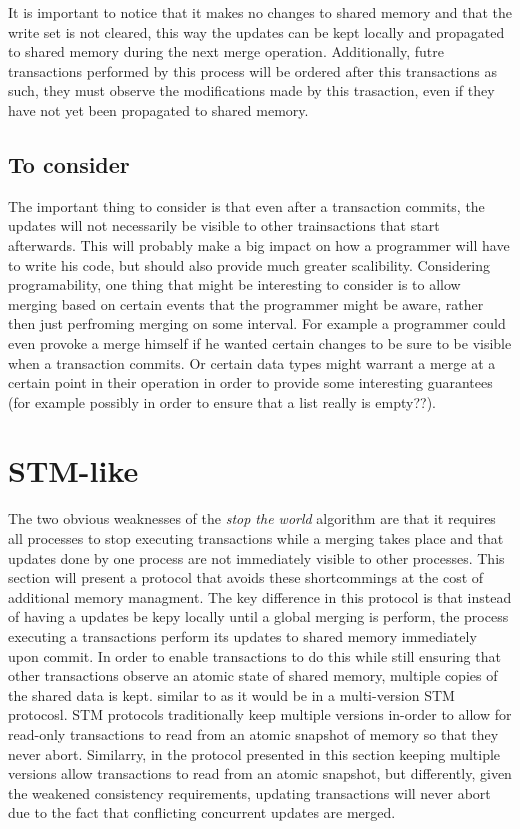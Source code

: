\documentclass[11pt,letterpaper]{article}
\begin{document}
It is important to notice that it makes no changes to shared memory and that the write set is not cleared,
this way the updates can be kept locally and propagated to shared memory during the next merge operation.
Additionally, futre transactions performed by this process will be ordered after this
transactions as such, they must observe the modifications made by this trasaction, even if they
have not yet been propagated to shared memory.


\subsection{To consider}
The important thing to consider is that even after a transaction commits, the updates will not
necessarily be visible to other trainsactions that start afterwards.
This will probably make a big impact on how a programmer will have to write his code, but should
also provide much greater scalibility.
Considering programability, one thing that might be interesting to consider is to allow merging
based on certain events that the programmer might be aware, rather then just perfroming merging
on some interval.
For example a programmer could even provoke a merge himself if he wanted certain changes to be sure
to be visible when a transaction commits.
Or certain data types might warrant a merge at a certain point in their operation in order
to provide some interesting guarantees (for example possibly in order to ensure 
that a list really is empty??).


\section{STM-like}
The two obvious weaknesses of the \emph{stop the world} algorithm are that
it requires all processes to stop executing transactions while a merging takes place
and that updates done by one process are not immediately visible to other processes.
This section will present a protocol that avoids these shortcommings at the cost
of additional memory managment.
The key difference in this protocol is that instead of having a updates be kepy
locally until a global merging is perform, the process executing a transactions
perform its updates to shared memory immediately upon commit.
In order to enable transactions to do this while still ensuring that other transactions
observe an atomic state of shared memory, multiple copies of the shared data is kept.
similar to as it would be in a multi-version STM protocosl.
STM protocols traditionally keep multiple versions in-order to allow for read-only transactions
to read from an atomic snapshot of memory so that they never abort.
Similarry, in the protocol presented in this section keeping multiple versions allow transactions to read
from an atomic snapshot, but differently, given the weakened consistency requirements, updating transactions
will never abort due to the fact that conflicting concurrent updates are merged.
\end{document}
